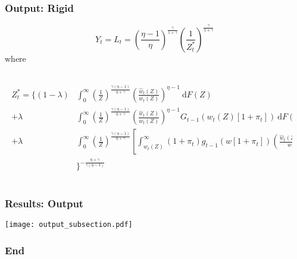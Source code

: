\documentclass{beamer}
\begin{document}
\begin{frame}[t]\frametitle{Output: Rigid}
\fontsize{9pt}{12}\selectfont

    \begin{equation*}
        \label{eq:output_rigid}
        Y_t = L_t = \left(\frac{\eta - 1}{\eta} \right)^{\frac{\gamma}{1 + \gamma}}\left( \frac{1}{Z_t^*} \right)^{\frac{\gamma}{1 + \gamma}}
    \end{equation*}
    where

\begin{columns}[T]
\begin{column}{0.1\textwidth}

    \begin{align*}
        \label{eq:z_star}
        \begin{split}
        Z_t^* = \Big\{(1 - \lambda) &\int_{0}^{\infty} \! \left( \frac{1}{Z} \right)^{\frac{\gamma(\eta - 1)}{\eta + \gamma}} \left( \frac{\hat{w}_t(Z)}{w_t(Z)} \right)^{\eta - 1}\ \mathup{d}F(Z) \\
              +            \lambda  &\int_{0}^{\infty} \! \left( \frac{1}{Z} \right)^{\frac{\gamma(\eta - 1)}{\eta + \gamma}} \left( \frac{\hat{w}_t(Z)}{w_t(Z)} \right)^{\eta - 1} G_{t-1}\left( w_t(Z)[1 + \pi_t] \right)                                                     \ \mathup{d}F(Z)\\
              +            \lambda  &\int_{0}^{\infty} \! \left( \frac{1}{Z} \right)^{\frac{\gamma(\eta - 1)}{\eta + \gamma}} \left[ \int_{w_t(Z)}^{\infty} (1 + \pi_t)g_{t-1}\left( w[1 + \pi_t] \right) \left( \frac{\hat{w}_t(Z)}{w} \right)^{\eta - 1}\ \mathup{d}w \right] \mathup{d}F(Z)  \\
              &\Big\}^{-\frac{\eta + \gamma}{\gamma(\eta - 1)}}
        \end{split}
    \end{align*}


\end{column}
\begin{column}{0.1\textwidth}
\end{column}
\end{columns}
\end{frame}

\begin{frame}[t]\frametitle{Results: Output}

    \begin{center}
      \texttt{[image: output\_subsection.pdf]}
      \label{fig:output}
    \end{center}



\end{frame}


\begin{frame}[t]\frametitle{End}



\end{frame}
\end{document}
